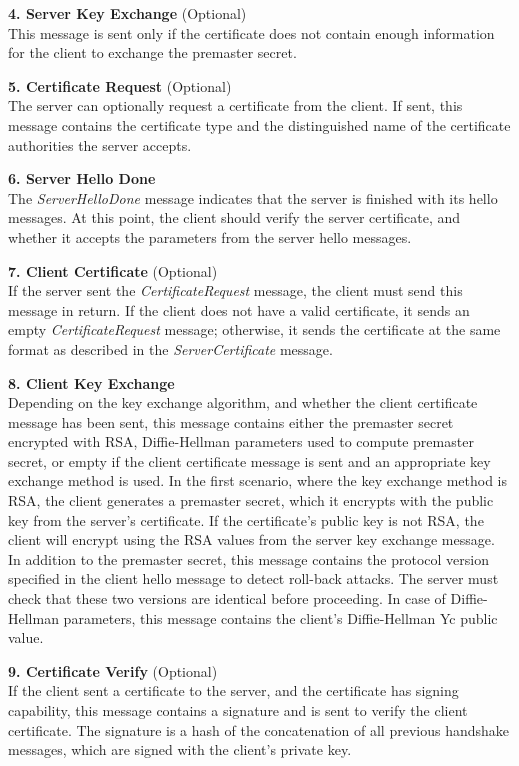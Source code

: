 \documentclass[12pt,a4paper,titlepage]{report}
\begin{document}
\textbf{4. Server Key Exchange} (Optional)\\
This message is sent only if the certificate does not contain enough information for the client to exchange the premaster secret. 

\textbf{5. Certificate Request} (Optional)\\
The server can optionally request a certificate from the client. If sent, this message contains the certificate type and the distinguished name of the certificate authorities the server accepts. 

\textbf{6. Server Hello Done}\\
The \emph{ServerHelloDone} message indicates that the server is finished with its hello messages. At this point, the client should verify the server certificate, and whether it accepts the parameters from the server hello messages. 

\textbf{7. Client Certificate} (Optional)\\
If the server sent the \emph{CertificateRequest} message, the client must send this message in return. If the client does not have a valid certificate, it sends an empty \emph{CertificateRequest} message; otherwise, it sends the certificate at the same format as described in the \emph{ServerCertificate} message. 

\textbf{8. Client Key Exchange}\\
Depending on the key exchange algorithm, and whether the client certificate message has been sent, this message contains either the premaster secret encrypted with RSA, Diffie-Hellman parameters used to compute premaster secret, or empty if the client certificate message is sent and an appropriate key exchange method is used. In the first scenario, where the key exchange method is RSA, the client generates a premaster secret, which it encrypts with the public key from the server's certificate. If the certificate's public key is not RSA, the client will encrypt using the RSA values from the server key exchange message. In addition to the premaster secret, this message contains the protocol version specified in the client hello message to detect roll-back attacks. The server must check that these two versions are identical before proceeding. In case of Diffie-Hellman parameters, this message contains the client's Diffie-Hellman Yc public value.	

\textbf{9. Certificate Verify} (Optional)\\
If the client sent a certificate to the server, and the certificate has signing capability, this message contains a signature and is sent to verify the client certificate. The signature is a hash of the concatenation of all previous handshake messages, which are signed with the client's private key.
\end{document}
